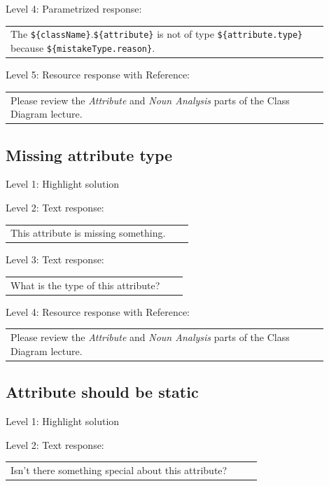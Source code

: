 \noindent Level 4: Parametrized response: \medskip

\begin{tabular}{|p{0.9\linewidth}}
The \verb|${className}|.\verb|${attribute}| is not of type \verb|${attribute.type}| because \verb|${mistakeType.reason}|.
\end{tabular} \medskip

\noindent Level 5: Resource response with Reference: \medskip

\begin{tabular}{|p{0.9\linewidth}}
Please review the \textit{Attribute} and \textit{Noun Analysis} parts of the Class Diagram lecture.
\end{tabular} \medskip


\subsection{Missing attribute type}

\noindent Level 1: Highlight solution \medskip

\noindent Level 2: Text response: \medskip

\begin{tabular}{|p{0.9\linewidth}}
This attribute is missing something.
\end{tabular} \medskip

\noindent Level 3: Text response: \medskip

\begin{tabular}{|p{0.9\linewidth}}
What is the type of this attribute?
\end{tabular} \medskip

\noindent Level 4: Resource response with Reference: \medskip

\begin{tabular}{|p{0.9\linewidth}}
Please review the \textit{Attribute} and \textit{Noun Analysis} parts of the Class Diagram lecture.
\end{tabular} \medskip


\subsection{Attribute should be static}

\noindent Level 1: Highlight solution \medskip

\noindent Level 2: Text response: \medskip

\begin{tabular}{|p{0.9\linewidth}}
Isn't there something special about this attribute?
\end{tabular} \medskip

